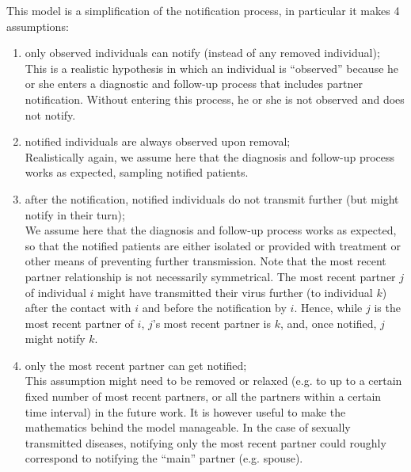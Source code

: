 \documentclass[a4paper,10pt]{article}
\begin{document}
This model is a simplification of the notification process, in particular it makes 4 assumptions:
\begin{enumerate}
\item only observed individuals can notify (instead of any removed individual);\\

This is a realistic hypothesis in which an individual is ``observed'' because he or she enters a diagnostic and follow-up process that includes partner notification. Without entering this process, he or she is not observed and does not notify.

\item notified individuals are always observed upon removal;\\

Realistically again, we assume here that the diagnosis and follow-up process works as expected, sampling notified patients.

\item after the notification, notified individuals do not transmit further (but might notify in their turn);\\

We assume here that the diagnosis and follow-up process works as expected, so that the notified patients are either isolated or provided with treatment or other means of preventing further transmission. 
Note that the most recent partner relationship is not necessarily symmetrical. The most recent partner $j$ of individual $i$ might have transmitted their virus further (to individual $k$) after the contact with $i$ and before the notification by $i$. Hence, while $j$ is the most recent partner of $i$, $j$'s most recent partner is $k$, and, once notified, $j$ might notify $k$.  

\item only the most recent partner can get notified;\\

This assumption might need to be removed or relaxed (e.g. to up to a certain fixed number of most recent partners, or all the partners within a certain time interval) in the future work. It is however useful to make the mathematics behind the model manageable. In the case of sexually transmitted diseases, notifying only the most recent partner could roughly correspond to notifying the ``main'' partner (e.g. spouse).
\end{enumerate}
\end{document}

